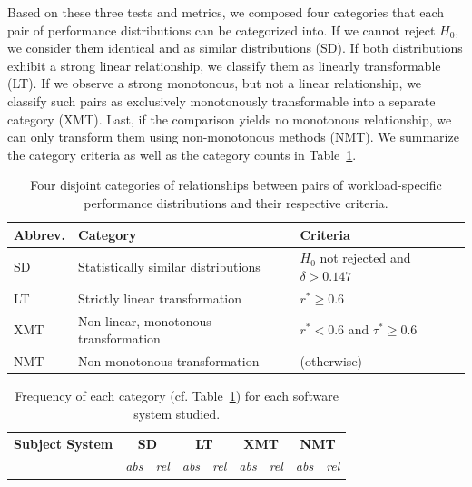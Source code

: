 {\color{black} Based on these three tests and metrics, we composed four categories that each pair of performance distributions can be categorized into. If we cannot reject $H_0$, we consider them identical and as similar distributions (\textsf{\colorbox{cs-color}{SD}}). If both distributions exhibit a strong linear relationship, we classify them as linearly transformable (\textsf{\colorbox{lt-color}{LT}}). If we observe a strong monotonous, but not a linear relationship, we classify such pairs as exclusively monotonously transformable into a separate category (\textsf{\colorbox{xmt-color}{XMT}}). Last, if the comparison yields no monotonous relationship, we can only transform them using non-monotonous methods (\textsf{\colorbox{nmt-color}{NMT}}). We summarize the category criteria as well as the category counts in Table~\ref{tab:categorization}. 

\begin{table}
	\footnotesize
	\caption{Four disjoint categories of relationships between pairs of workload-specific performance distributions and their respective criteria.}
	\centering
\begin{tabular*}{\linewidth}{lp{3.89cm}p{3cm}}	
	\toprule
	 \textbf{Abbrev.} & \textbf{Category} & \textbf{Criteria}\\
	 \midrule
	 \cellcolor{cs-color}\textsf{SD} & {Statistically similar distributions} & {$H_0$ not rejected} and $\delta > 0.147$ \\
	 \cellcolor{lt-color}\textsf{LT} & {Strictly linear transformation} & $r^* \geq 0.6$ \\
	\cellcolor{xmt-color}\textsf{XMT} & {Non-linear, monotonous transformation} & $r^* < 0.6 $ and $ \tau^* \geq 0.6$ \\
	\cellcolor{nmt-color}\textsf{NMT} & {Non-monotonous transformation}  & (otherwise) \\%
	\bottomrule
\end{tabular*}
\label{tab:categorization}
\end{table}
\begin{table}
	\footnotesize
	\caption{Frequency of each category (cf. Table~\ref{tab:categorization}) for each software system studied.}
\begin{tabular}{lrrrrrrrr}	
	\toprule
	\textbf{Subject System} & \multicolumn{2}{c}{\textbf{\cellcolor{cs-color}\textsf{SD}}} & \multicolumn{2}{c}{\textbf{\cellcolor{lt-color}\textsf{LT}}} & \multicolumn{2}{c}{\textbf{\cellcolor{xmt-color}\textsf{XMT}}} & \multicolumn{2}{c}{\textbf{\cellcolor{nmt-color}\textsf{NMT}}}\\
	 & \textit{abs} & \textit{rel} & \textit{abs} &\textit{rel} & \textit{abs} & \textit{rel}& \textit{abs} & \textit{rel}\\
	\midrule
	

\end{tabular}
\end{table}}
